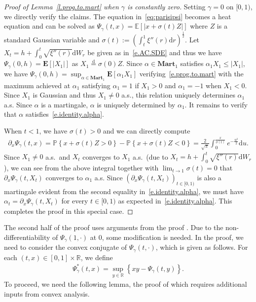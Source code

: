 \documentclass[11pt]{amsart}
\theoremstyle{remark}
\theoremstyle{definition}
\numberwithin{equation}{section}
\numberwithin{proposition}{section}
\numberwithin{figure}{section}
\numberwithin{table}{section}
\newcommand{\R}{\mathbb{R}}
\newcommand{\E}{\mathbb{E}}
\renewcommand{\P}{\mathbb{P}}
\newcommand{\EE}{\mathbf{E}}
\renewcommand{\leq}{\leqslant}
\newcommand{\Ll}{\left}
\newcommand{\Rr}{\right}
\renewcommand{\d}{\mathrm{d}}
\newcommand{\1}{\mathbf{1}}
\newcommand{\bmart}{\mathbf{Mart}}
\begin{document}
\begin{proof}[Proof of Lemma~\ref{l.prog.to.mart} when $\gamma$ is constantly zero]
Setting $\gamma=0$ on $[0,1)$, we directly verify the claims. The equation in~\eqref{eq:parisipsi} becomes a heat equation and can be solved as $\Psi_\gamma(t,x)=\E\Ll[|x+\sigma(t)Z|\Rr]$ where $Z$ is a standard Gaussian variable and $\sigma(t):=(\int_t^1\xi''(r)\d r)^\frac{1}{2}$. Let $X_t=h+\int_0^t\sqrt{\xi''(r)}\d W_r$ be given as in~\eqref{e.AC.SDE} and thus we have $\Psi_\gamma(0,h)=\EE\Ll[|X_1|\Rr]$ as $X_1\stackrel{\d}{=}\sigma(0)Z$. Since $\alpha\in\bmart_1$ satisfies $\alpha_1X_1\leq |X_1|$, we have $\Psi_\gamma(0,h)=\sup_{\alpha\in\bmart_1}\EE\Ll[\alpha_1X_1\Rr]$ verifying~\eqref{e.prog.to.mart} with the maximum achieved at $\alpha_1$ satisfying $\alpha_1=1$ if $X_1>0$ and $\alpha_1=-1$ when $X_1<0$. Since $X_1$ is Gaussian and thus $X_1\neq0$ a.s., this relation uniquely determines $\alpha_1$ a.s. Since $\alpha$ is a martingale, $\alpha$ is uniquely determined by $\alpha_1$. It remains to verify that $\alpha$ satisfies~\eqref{e.identity.alpha}.

When $t<1$, we have $\sigma(t)>0$ and we can directly compute
\begin{align*}
    \partial_x\Psi_\gamma(t,x)=\P\Ll\{x+\sigma(t)Z>0\Rr\} - \P\Ll\{x+\sigma(t)Z<0\Rr\} = \frac{2}{\sqrt{\pi}}\int_0^{\frac{x}{\sigma(t)}}e^{-\frac{u^2}{2}}\d u.
\end{align*}
Since $X_1\neq 0$ a.s.\ and $X_t$ converges to $X_1$ a.s.\ (due to $X_t=h+\int_0^t\sqrt{\xi''(r)}\d W_r$), we can see from the above integral together with $\lim_{t\to1}\sigma(t)=0$ that $\partial_x\Psi_\gamma(t,X_t)$ converges to $\alpha_1$ a.s. Since $\Ll(\partial_x\Psi_\gamma(t,X_t)\Rr)_{t\in[0,1)}$ is also a martingale evident from the second equality in~\eqref{e.identity.alpha}, we must have $\alpha_t=\partial_x\Psi_\gamma(t,X_t)$ for every $t\in[0,1)$ as expected in~\eqref{e.identity.alpha}. This completes the proof in this special case.
\end{proof}


The second half of the proof uses arguments from the proof \cite[Lemma~2.2]{mourrat2025uninverting}.
Due to the non-differentiability of $\Psi_\gamma(1,\cdot)$ at $0$, some modification is needed.
In the proof, we need to consider the convex conjugate of $\Psi_\gamma(t,\cdot)$, which is given as follows.
For each $(t,x)\in[0,1]\times\R$, we define
\begin{align}\label{e.Psi^*(t,x)=}
    \Psi^*_\gamma(t,x) = \sup_{y\in\R}\Ll\{xy - \Psi_\gamma(t,y)\Rr\}.
\end{align}
To proceed, we need the following lemma, the proof of which requires additional inputs from convex analysis.
\end{document}
